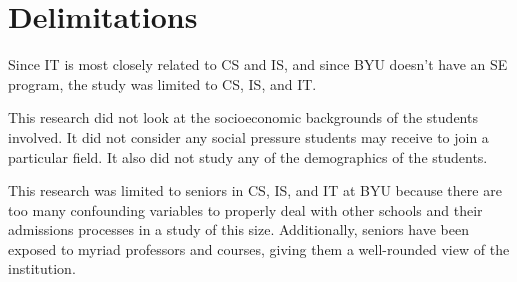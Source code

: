 \section{Delimitations}
Since IT is most closely related to CS and IS, and since BYU doesn't have an SE program, the study was limited to CS, IS, and IT.

This research did not look at the socioeconomic backgrounds of the students involved. It did not consider any social pressure students may receive to join a particular field. It also did not study any of the demographics of the students.

This research was limited to seniors in CS, IS, and IT at BYU because there are too many confounding variables to properly deal with other schools and their admissions processes in a study of this size. Additionally, seniors have been exposed to myriad professors and courses, giving them a well-rounded view of the institution.
